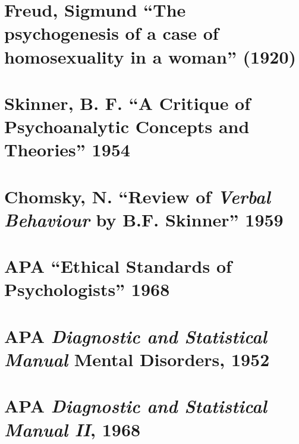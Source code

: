 \begin{refsection}
\begin{appendices}
\label{app: KraftEbbing3}


\section{Freud, Sigmund ``The psychogenesis of a case of homosexuality in a woman'' (1920)}
\label{freudsigmundthepsychogenesisofacaseofhomosexualityinawoman1920}

\label{app: Freud}


\section{Skinner, B. F. ``A Critique of Psychoanalytic Concepts and Theories'' 1954}
\label{skinnerb.f.acritiqueofpsychoanalyticconceptsandtheories1954}

\label{app: Skinner}


\section{Chomsky, N. ``Review of \emph{Verbal Behaviour} by B.F. Skinner'' 1959}
\label{chomskyn.reviewofverbalbehaviourbyb.f.skinner1959}

\label{app: Chomsky}


\section{APA ``Ethical Standards of Psychologists'' 1968}
\label{apaethicalstandardsofpsychologists1968}

\label{app: APAEthics}


\section{APA \emph{Diagnostic and Statistical Manual} Mental Disorders, 1952}
\label{apadiagnosticandstatisticalmanualmentaldisorders1952}

\label{app: DSMI}


\section{APA \emph{Diagnostic and Statistical Manual II}, 1968}
\label{apadiagnosticandstatisticalmanualii1968}


\end{appendices}
\end{refsection}

